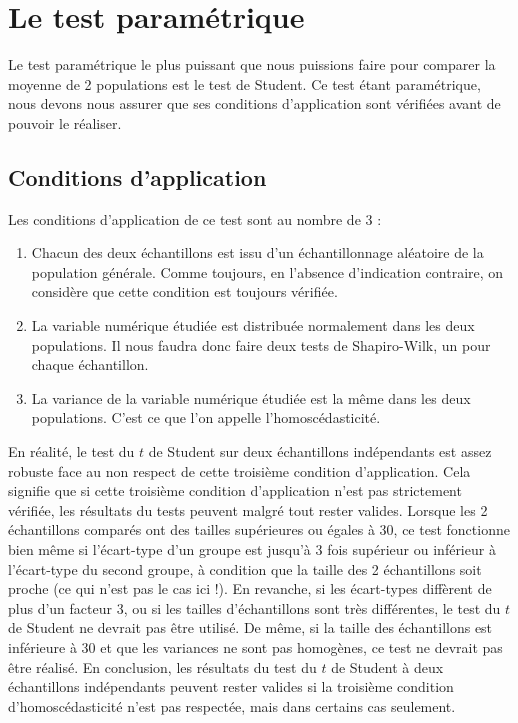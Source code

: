 \documentclass[
  a4paper,
  DIV=11,
  numbers=noendperiod,
  oneside]{scrreprt}
\providecommand{\tightlist}{%
  \setlength{\itemsep}{0pt}\setlength{\parskip}{0pt}}\usepackage{longtable,booktabs,array}
\begin{document}
\hypertarget{le-test-paramuxe9trique-2}{%
\section{Le test paramétrique}\label{le-test-paramuxe9trique-2}}

Le test paramétrique le plus puissant que nous puissions faire pour
comparer la moyenne de 2 populations est le test de Student. Ce test
étant paramétrique, nous devons nous assurer que ses conditions
d'application sont vérifiées avant de pouvoir le réaliser.

\hypertarget{sec-robust}{%
\subsection{Conditions d'application}\label{sec-robust}}

Les conditions d'application de ce test sont au nombre de 3 :

\begin{enumerate}
\def\labelenumi{\arabic{enumi}.}
\tightlist
\item
  Chacun des deux échantillons est issu d'un échantillonnage aléatoire
  de la population générale. Comme toujours, en l'absence d'indication
  contraire, on considère que cette condition est toujours vérifiée.
\item
  La variable numérique étudiée est distribuée normalement dans les deux
  populations. Il nous faudra donc faire deux tests de Shapiro-Wilk, un
  pour chaque échantillon.
\item
  La variance de la variable numérique étudiée est la même dans les deux
  populations. C'est ce que l'on appelle l'homoscédasticité.
\end{enumerate}

En réalité, le test du \(t\) de Student sur deux échantillons
indépendants est assez robuste face au non respect de cette troisième
condition d'application. Cela signifie que si cette troisième condition
d'application n'est pas strictement vérifiée, les résultats du tests
peuvent malgré tout rester valides. Lorsque les 2 échantillons comparés
ont des tailles supérieures ou égales à 30, ce test fonctionne bien même
si l'écart-type d'un groupe est jusqu'à 3 fois supérieur ou inférieur à
l'écart-type du second groupe, à condition que la taille des 2
échantillons soit proche (ce qui n'est pas le cas ici !). En revanche,
si les écart-types diffèrent de plus d'un facteur 3, ou si les tailles
d'échantillons sont très différentes, le test du \(t\) de Student ne
devrait pas être utilisé. De même, si la taille des échantillons est
inférieure à 30 et que les variances ne sont pas homogènes, ce test ne
devrait pas être réalisé. En conclusion, les résultats du test du \(t\)
de Student à deux échantillons indépendants peuvent rester valides si la
troisième condition d'homoscédasticité n'est pas respectée, mais dans
certains cas seulement.
\end{document}
